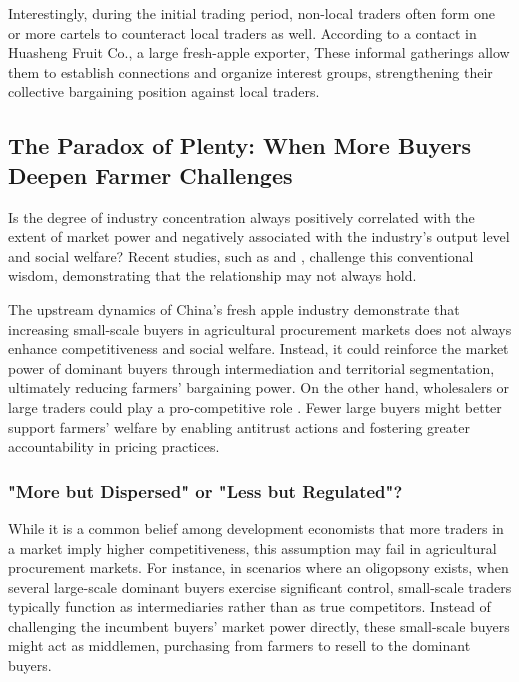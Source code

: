 Interestingly, during the initial trading period, non-local traders often form one or more cartels to counteract local traders as well. According to a contact in Huasheng Fruit Co., a large fresh-apple exporter,  These informal gatherings allow them to establish connections and organize interest groups, strengthening their collective bargaining position against local traders.







\subsection{The Paradox of Plenty: When More Buyers Deepen Farmer Challenges}
\noindent Is the degree of industry concentration always positively correlated with the extent of market power and negatively associated with the industry’s output level and social welfare? Recent studies, such as \cite{merel2017buyer} and \cite{crespi2012competition}, challenge this conventional wisdom, demonstrating that the relationship may not always hold.

The upstream dynamics of China's fresh apple industry demonstrate that increasing small-scale buyers in agricultural procurement markets does not always enhance competitiveness and social welfare. Instead, it could reinforce the market power of dominant buyers through intermediation and territorial segmentation, ultimately reducing farmers' bargaining power. On the other hand, wholesalers or large traders could play a pro-competitive role \citep{Belton_et_al_2024}. Fewer large buyers might better support farmers' welfare by enabling antitrust actions and fostering greater accountability in pricing practices.


\subsubsection{"More but Dispersed" or "Less but Regulated"?}
\noindent While it is a common belief among development economists that more traders in a market imply higher competitiveness, this assumption may fail in agricultural procurement markets. For instance, in scenarios where an oligopsony exists, when several large-scale dominant buyers exercise significant control, small-scale traders typically function as intermediaries rather than as true competitors. Instead of challenging the incumbent buyers' market power directly, these small-scale buyers might act as middlemen, purchasing from farmers to resell to the dominant buyers. 

